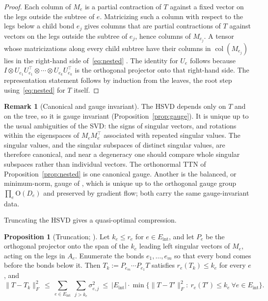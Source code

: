 \documentclass[11pt]{article}
\newcommand{\col}{\operatorname{col}}
\newcommand{\norm}[1]{\lVert #1\rVert}
\newcommand{\Eint}{E_{\mathrm{int}}}
\theoremstyle{definition}
\newtheorem{proposition}[theorem]{Proposition}
\newtheorem{remark}[theorem]{Remark}
\numberwithin{equation}{section}
\begin{document}
\begin{proof}
Each column of $M_e$ is a partial contraction of $T$ against a fixed vector on the legs outside the subtree of $e$. Matricizing such a column with respect to the legs below a child bond $e_j$ gives columns that are partial contractions of $T$ against vectors on the legs outside the subtree of $e_j$, hence columns of $M_{e_j}$. A tensor whose matricizations along every child subtree have their columns in $\col(M_{e_j})$ lies in the right-hand side of~\eqref{eq:nested} \citep[proof of Proposition~B.1]{furman2026benign}. The identity for $U_e$ follows because $I\otimes U_{e_1}U_{e_1}^\top\otimes\cdots\otimes U_{e_k}U_{e_k}^\top$ is the orthogonal projector onto that right-hand side. The representation statement follows by induction from the leaves, the root step using~\eqref{eq:nested} for $T$ itself.
\end{proof}

\begin{remark}[Canonical and gauge invariant]\label{rem:hsvd-canonical}
The HSVD depends only on $T$ and on the tree, so it is gauge invariant (Proposition~\ref{prop:gauge}). It is unique up to the usual ambiguities of the SVD: the signs of singular vectors, and rotations within the eigenspaces of $M_eM_e^\top$ associated with repeated singular values. The singular values, and the singular subspaces of distinct singular values, are therefore canonical, and near a degeneracy one should compare whole singular subspaces rather than individual vectors. The orthonormal TTN of Proposition~\ref{prop:nested} is one canonical gauge. Another is the balanced, or minimum-norm, gauge of \citet[Appendix~F]{furman2026benign}, which is unique up to the orthogonal gauge group $\prod_e\mathrm O(D_e)$ and preserved by gradient flow; both carry the same gauge-invariant data.
\end{remark}

Truncating the HSVD gives a quasi-optimal compression.

\begin{proposition}[Truncation; {\citealp{grasedyck2010hierarchical}}]\label{prop:truncation}
Let $k_e\le r_e$ for $e\in\Eint$, and let $P_e$ be the orthogonal projector onto the span of the $k_e$ leading left singular vectors of $M_e$, acting on the legs in $A_e$. Enumerate the bonds $e_1,\dots,e_m$ so that every bond comes before the bonds below it. Then $T_k:=P_{e_m}\cdots P_{e_1}T$ satisfies $r_e(T_k)\le k_e$ for every $e$, and
\[
\norm{T-T_k}_F^2\ \le\ \sum_{e\in\Eint}\ \sum_{j>k_e}\sigma_{e,j}^2\ \le\ |\Eint|\cdot\min\big\{\norm{T-T'}_F^2:\ r_e(T')\le k_e\ \forall e\in\Eint\big\}.
\]
\end{proposition}
\end{document}
